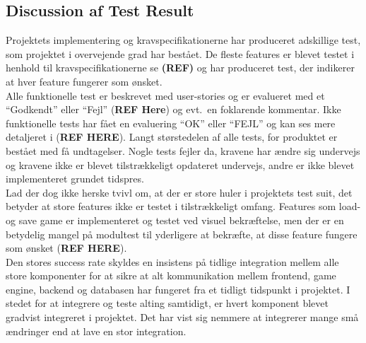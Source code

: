 \subsection{Discussion af Test Result}
Projektets implementering og kravspecifikationerne har produceret adskillige test, som 
projektet i overvejende grad har bestået. De fleste features er blevet
testet i henhold til kravspecifikationerne se \textbf{(REF)} og har produceret 
test, der indikerer at hver feature fungerer som ønsket. \\

Alle funktionelle test er beskrevet med user-stories og er evalueret med et ``Godkendt''
eller ``Fejl'' (\textbf{REF Here}) og evt.\ en foklarende kommentar. Ikke funktionelle 
tests har fået en evaluering ``OK'' eller ``FEJL'' og kan ses mere detaljeret i (\textbf{REF HERE}).
Langt størstedelen af alle tests, for produktet er bestået med få undtagelser. 
Nogle tests fejler da, kravene har ændre sig undervejs og kravene ikke er blevet tilstrækkeligt opdateret undervejs, andre er ikke blevet implementeret grundet tidspres. \\

Lad der dog ikke herske tvivl om, at der er store huler i projektets test suit, det
betyder at store features ikke er testet i tilstrækkeligt omfang. Features som load- og save game er implementeret og testet ved visuel bekræftelse, men der er en betydelig mangel på modultest til yderligere at bekræfte, at disse feature fungere som ønsket (\textbf{REF HERE}). \\

Den stores success rate skyldes en insistens på tidlige integration mellem alle store komponenter for at sikre at alt kommunikation mellem frontend, game engine, backend og databasen har fungeret fra et tidligt tidspunkt i projektet.
I stedet for at integrere og teste alting samtidigt, er hvert komponent blevet gradvist integreret i projektet. Det har vist sig nemmere at integrerer mange små ændringer end at lave en stor integration.


